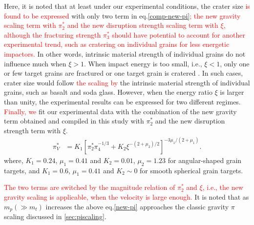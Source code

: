 \documentclass[3p,authoryear]{elsarticle}
\newcommand{\red}[1]{\textcolor{red}{#1}}
\begin{document}
Here, it is noted that at least under our experimental conditions, the crater size \red{is found to be expressed} with only two term in eq.\eqref{comp-new-pi}\red{; the new gravity scaling term with $\pi_2^*$ and the new disruption strength scaling term with $\xi$, although the fracturing strength $\pi_3^*$ should have potential to account for another experimental trend, such as cratering on individual grains for less energetic impactors.}
In other words, intrinsic material strength of individual grains do not influence much when $\xi>1$.
When impact energy is too small, i.e., $\xi<1$, only one or few target grains are fractured or one target grain is cratered \citep{guettler2012}.
In such cases, crater size would follow \red{the scaling by} the intrinsic material strength of individual grains, such as basalt and soda glass.
However, when the energy ratio $\xi$ is larger than unity, the experimental results can be expressed for two different regimes. 
\red{Finally, we} fit our experimental data with the combination of the new gravity term obtained and compiled in this study with $\pi_2^*$ and the new disruption strength term with $\xi$.
\begin{align}
	\pi_V^*&=K_1\left[\pi_2^{*}\pi_4^{-1/3}+K_2\xi^{-(2+\mu_2)/2}\right]^{-3\mu_1/(2+\mu_1)}. \label{new-pi}
\end{align}
where, $K_1=0.24 $, $\mu_1=0.41$ and $K_2=0.01$, $\mu_2=1.23$ for angular-shaped grain targets, and $K_1=0.6 $, $\mu_1=0.41$ and $K_2\sim 0$ for smooth spherical grain targets.
\begin{comment}
Furthermore, when the energy ratio $\xi$ is greater than unity and the crater volume is much ,
\begin{align}
	\pi_V^*&=K_1\pi_2^{*-3\mu_1/(2+\mu_1)}, \label{newgravity}
\end{align}
and in the new fracture strength regime,
\begin{align}
	\pi_V^*&=K_1K_2\xi^{3\mu_1(2+\mu_2)/2(2+\mu_1)}. \label{newstrength}
\end{align}
\end{comment}
\red{The two terms are switched by the magnitude relation of $\pi_2^*$ and $\xi$, i.e., the new gravity scaling is applicable, when the velocity is large enough.}
It is noted that as $m_p(\gg m_t)$ increases the above eq.\eqref{new-pi} approaches the classic gravity $\pi$ scaling discussed in \ref{sec:piscaling}.
\end{document}
